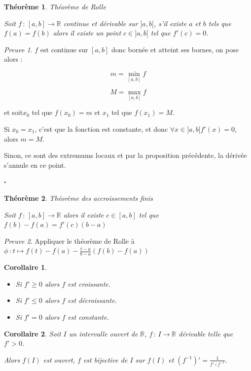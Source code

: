 \documentclass[]{article}
\newtheorem{mythm}{Théorème}
\newtheorem{mycor}{Corollaire}
\theoremstyle{remark}
\newtheorem{myproof}{Preuve}
\theoremstyle{definition}
\newcommand{\cqfd}{
	\hfill$\square$
}
\newcommand{\funcshort}[3]{
#1 \, : \, #2 \longrightarrow #3
}
\begin{document}
\begin{mythm}Théorème de Rolle
	
	Soit $\funcshort{f}{[a, b]}{\mathbb{R}}$ continue et dérivable sur $]a, b[$, s'il existe $a$ et $b$ tels que $f(a)=f(b)$ alors il existe un point $c \in ]a, b[$ tel que $f'(c)=0$.
\end{mythm}

\begin{myproof}
	$f$ est continue sur $[a,b]$ donc bornée et atteint ses bornes, on pose alors :
	
	$$m = \min_{[a, b]} f$$
	
	$$M = \max_{[a, b]} f$$
	
	et soit$x_0$ tel que $f(x_0)=m$ et $x_1$ tel que $f(x_1)=M$.
	
	Si $x_0=x_1$, c'est que la fonction est constante, et donc $\forall x \in ]a, b[f'(x)=0$, alors $m=M$.
	
	Sinon, ce sont des extremums locaux et par la proposition précédente, la dérivée s'annule en ce point.
	
	\cqfd
\end{myproof}

\begin{mythm}Théorème des accroissements finis

	Soit $\funcshort{f}{[a, b]}{\mathbb{R}}$ alors il existe $c \in [a, b]$ tel que $f(b)-f(a) = f'(c)(b-a)$
\end{mythm}

\begin{myproof}
	Appliquer le théorème de Rolle à $\phi ~ : t \longmapsto f(t) - f(a) - \frac{t-a}{b-a}(f(b)-f(a))$
\end{myproof}

\begin{mycor}
	\begin{itemize}
		\item Si $f' \geqslant 0$ alors $f$ est croissante.
		\item Si $f' \leqslant 0$ alors $f$ est décroissante. 
		\item Si $f' = 0$ alors $f$ est constante.
	\end{itemize}
\end{mycor}

\begin{mycor}
	Soit $I$ un intervalle ouvert de $\mathbb{R}$, $\funcshort{f}{I}{\mathbb{R}}$ dérivable telle que $f' > 0$.
	
	Alors $f(I)$ est ouvert, $f$ est bijective de $I$ sur $f(I)$ et $(f^{-1})'=\frac{1}{f' \circ f^{-1}}$.
\end{mycor}
\end{document}
